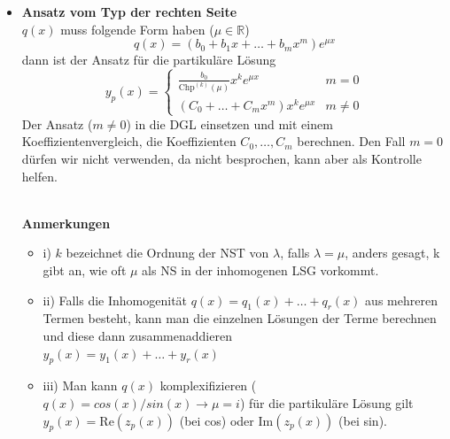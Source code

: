 \documentclass[8pt, a4paper, landscape, fleqn]{scrartcl}
\newenvironment {annotation}[1]
				{\begin{itshape} \begin{small} \textbf{#1} \begin{itemize}}
				{\end{itemize} \end{small} \end{itshape}}
\begin{document}
\begin{multicols*}{3}
\begin{itemize}
					\begin{annotation}{Anmerkungen}
						\item[i)] Falls man zwei Störterme hat, also $b(x)=b_1(x)+ b_2(x)$, macht man zwei Ansätze und man bekommt \underline{zwei} part. Lösungen $y_{p_1}(x), y_{p_2}(x)$
						\item[ii)] Falls der Ansatz $y_p$ ein Term hat, welcher bereits in $y_h(x)$ vorkommt, muss der Ansatz \underline{mit x multipliziert} werden
					\end{annotation}  

					\item \textbf{Ansatz vom Typ der rechten Seite}\\
					$q(x)$ muss folgende Form haben ($\mu \in \mathbb{R}$)
					\begin{equation*}
						q(x)=(b_0+b_1x+\dots+b_mx^m)e^{\mu x}
					\end{equation*}
					dann ist der Ansatz für die partikuläre Lösung
					\begin{equation*}
						y_p(x)=
						\begin{cases}
							\frac{b_0}{\text{Chp}^{(k)}(\mu)}x^k e^{\mu x} \hspace{10pt} &m=0\\
							(C_0+ \dots +C_mx^m)x^ke^{\mu x} &m\ne 0
						\end{cases}
					\end{equation*}    
					Der Ansatz ($m\ne 0$) in die DGL einsetzen und mit einem Koeffizientenvergleich, die Koeffizienten $C_0, \dots, C_m$ berechnen. Den Fall $m = 0$ dürfen wir nicht verwenden, da nicht besprochen, kann aber als Kontrolle helfen.\\\\
					\begin{annotation}{Anmerkungen}
						\item[i)] $k$ bezeichnet die Ordnung der NST von $\lambda$, falls $\lambda=\mu$, anders gesagt, k gibt an, wie oft $\mu$ als NS in der inhomogenen LSG vorkommt.
						\item[ii)] Falls die Inhomogenität $q(x)=q_1(x)+\dots+q_r(x)$ aus mehreren Termen besteht, kann man die einzelnen Lösungen der Terme berechnen und diese dann zusammenaddieren\\
						$y_p(x)=y_1(x)+\dots+y_r(x)$
						\item[iii)] Man kann $q(x)$ komplexifizieren ($q(x)=cos(x)/sin(x) \rightarrow \mu=i$) für die partikuläre Lösung gilt $y_p(x)=\text{Re}(z_p(x))$ (bei cos) oder $\text{Im}(z_p(x))$ (bei sin).\\

\end{annotation}
\end{itemize}
\end{multicols*}
\end{document}
